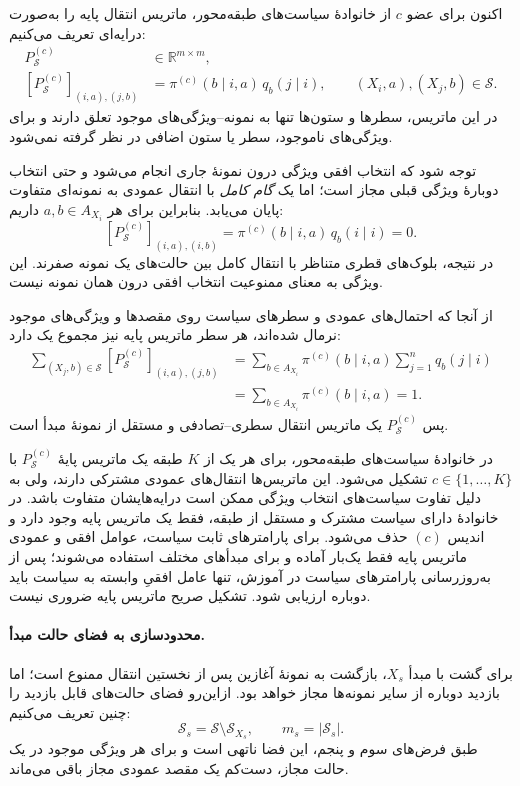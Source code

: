 اکنون برای عضو $c$ از خانوادهٔ سیاست‌های طبقه‌محور،
ماتریس انتقال پایه را به‌صورت درایه‌ای تعریف می‌کنیم:
\begin{equation}\label{cmp:eq:ch3-base-valid-transition}
\boxed{
\begin{aligned}
P_{\mathcal S}^{(c)}&\in\mathbb R^{m\times m},\\
[P_{\mathcal S}^{(c)}]_{(i,a),(j,b)}
&=\pi^{(c)}(b\mid i,a)\,q_b(j\mid i),
\qquad (X_i,a),(X_j,b)\in\mathcal S.
\end{aligned}
}
\end{equation}
در این ماتریس، سطرها و ستون‌ها تنها به نمونه--ویژگی‌های
موجود تعلق دارند و برای ویژگی‌های ناموجود، سطر یا
ستون اضافی در نظر گرفته نمی‌شود.

توجه شود که انتخاب افقی ویژگی درون نمونهٔ جاری انجام
می‌شود و حتی انتخاب دوبارهٔ ویژگی قبلی مجاز است؛
اما یک \emph{گام کامل} با انتقال عمودی به نمونه‌ای
متفاوت پایان می‌یابد. بنابراین برای هر
$a,b\in A_{X_i}$ داریم:
\[
\boxed{
[P_{\mathcal S}^{(c)}]_{(i,a),(i,b)}
=\pi^{(c)}(b\mid i,a)\,q_b(i\mid i)=0.
}
\]
در نتیجه، بلوک‌های قطری متناظر با انتقال کامل
بین حالت‌های یک نمونه صفرند. این ویژگی به معنای
ممنوعیت انتخاب افقی درون همان نمونه نیست.

از آنجا که احتمال‌های عمودی و سطرهای سیاست روی
مقصدها و ویژگی‌های موجود نرمال شده‌اند، هر سطر
ماتریس پایه نیز مجموع یک دارد:
\[
\begin{aligned}
\sum_{(X_j,b)\in\mathcal S}
[P_{\mathcal S}^{(c)}]_{(i,a),(j,b)}
&=\sum_{b\in A_{X_i}}\pi^{(c)}(b\mid i,a)
 \sum_{j=1}^{n}q_b(j\mid i)\\
&=\sum_{b\in A_{X_i}}\pi^{(c)}(b\mid i,a)=1.
\end{aligned}
\]
پس $P_{\mathcal S}^{(c)}$ یک ماتریس انتقال
سطری--تصادفی و مستقل از نمونهٔ مبدأ است.

در خانوادهٔ سیاست‌های طبقه‌محور، برای هر یک از
$K$ طبقه یک ماتریس پایهٔ $P_{\mathcal S}^{(c)}$
با $c\in\{1,\ldots,K\}$ تشکیل می‌شود. این
ماتریس‌ها انتقال‌های عمودی مشترکی دارند، ولی
به دلیل تفاوت سیاست‌های انتخاب ویژگی ممکن است
درایه‌هایشان متفاوت باشد. در خانوادهٔ دارای سیاست
مشترک و مستقل از طبقه، فقط یک ماتریس پایه وجود دارد
و اندیس $(c)$ حذف می‌شود. برای پارامترهای ثابت
سیاست، عوامل افقی و عمودی ماتریس پایه فقط یک‌بار
آماده و برای مبدأهای مختلف استفاده می‌شوند؛ پس از
به‌روزرسانی پارامترهای سیاست در آموزش، تنها عامل
افقیِ وابسته به سیاست باید دوباره ارزیابی شود.
تشکیل صریح ماتریس پایه ضروری نیست.

\paragraph{محدودسازی به فضای حالت مبدأ.}
برای گشت با مبدأ $X_s$، بازگشت به نمونهٔ آغازین
پس از نخستین انتقال ممنوع است؛ اما بازدید دوباره
از سایر نمونه‌ها مجاز خواهد بود. ازاین‌رو فضای
حالت‌های قابل بازدید را چنین تعریف می‌کنیم:
\begin{equation}\label{cmp:eq:ch3-state-space}
\boxed{
\mathcal S_s=\mathcal S\setminus\mathcal S_{X_s},
\qquad m_s=|\mathcal S_s|.
}
\end{equation}
طبق فرض‌های سوم و پنجم، این فضا ناتهی است و
برای هر ویژگی موجود در یک حالت مجاز،
دست‌کم یک مقصد عمودی مجاز باقی می‌ماند.

